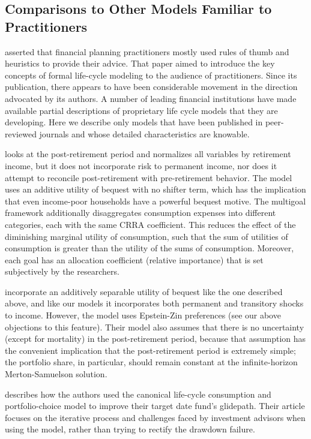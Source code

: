 \documentclass[12pt,letterpaper, fleqn]{article}
\begin{document}
\subsection{Comparisons to Other Models Familiar to Practitioners}

\cite{Gordon_2014} asserted that financial planning practitioners mostly used rules of thumb and heuristics to provide their advice.
That paper aimed to introduce the key concepts of formal life-cycle modeling to the audience of practitioners.
Since its publication, there appears to have been considerable movement in the direction advocated by its authors.
A number of leading financial institutions have made available partial descriptions of proprietary life cycle models that they are developing.
Here we describe only models that have been published in peer-reviewed journals and whose detailed characteristics are knowable.

\cite{Daga_2023} looks at the post-retirement period and normalizes all variables by retirement income, but it does not incorporate risk to permanent income, nor does it attempt to reconcile post-retirement with pre-retirement behavior.
The model uses an additive utility of bequest with no shifter term, which has the implication that even income-poor households have a powerful bequest motive.
The multigoal framework additionally disaggregates consumption expenses into different categories, each with the same CRRA coefficient.
This reduces the effect of the diminishing marginal utility of consumption, such that the sum of utilities of consumption is greater than the utility of the sums of consumption.
Moreover, each goal has an allocation coefficient (relative importance) that is set subjectively by the researchers.

\cite{O_Hara_2015} incorporate an additively separable utility of bequest like the one described above, and like our models it incorporates both permanent and transitory shocks to income.
However, the model uses Epstein-Zin preferences (see our above objections to this feature).
Their model also assumes that there is no uncertainty (except for mortality) in the post-retirement period, because that assumption has the convenient implication that the post-retirement period is extremely simple; the portfolio share, in particular, should remain constant at the infinite-horizon Merton-Samuelson solution.

\cite{Lanski2022} describes how the authors used the canonical life-cycle consumption and portfolio-choice model to improve their target date fund's glidepath.
Their article focuses on the iterative process and challenges faced by investment advisors when using the model, rather than trying to rectify the drawdown failure.
\end{document}
